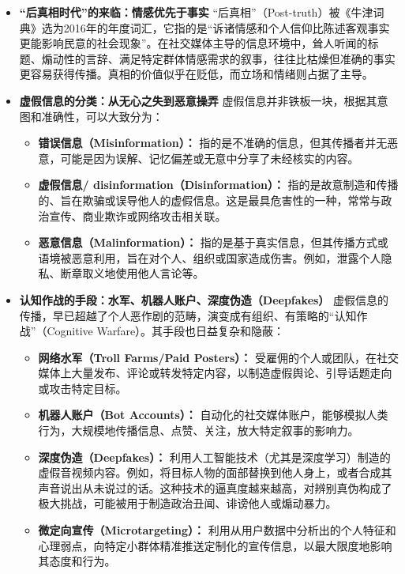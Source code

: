 \documentclass[UTF8, 10pt]{ctexbook}
\begin{document}
\begin{itemize}
    \item \textbf{“后真相时代”的来临：情感优先于事实}
    “后真相”（Post-truth）被《牛津词典》选为2016年的年度词汇，它指的是“诉诸情感和个人信仰比陈述客观事实更能影响民意的社会现象”。在社交媒体主导的信息环境中，耸人听闻的标题、煽动性的言辞、满足特定群体情感需求的叙事，往往比枯燥但准确的事实更容易获得传播。真相的价值似乎在贬低，而立场和情绪则占据了主导。

    \item \textbf{虚假信息的分类：从无心之失到恶意操弄}
    虚假信息并非铁板一块，根据其意图和准确性，可以大致分为：
    \begin{itemize}
        \item \textbf{错误信息（Misinformation）：} 指的是不准确的信息，但其传播者并无恶意，可能是因为误解、记忆偏差或无意中分享了未经核实的内容。
        \item \textbf{虚假信息/ disinformation（Disinformation）：} 指的是故意制造和传播的、旨在欺骗或误导他人的虚假信息。这是最具危害性的一种，常常与政治宣传、商业欺诈或网络攻击相关联。
        \item \textbf{恶意信息（Malinformation）：} 指的是基于真实信息，但其传播方式或语境被恶意利用，旨在对个人、组织或国家造成伤害。例如，泄露个人隐私、断章取义地使用他人言论等。
    \end{itemize}

    \item \textbf{认知作战的手段：水军、机器人账户、深度伪造（Deepfakes）}
    虚假信息的传播，早已超越了个人恶作剧的范畴，演变成有组织、有策略的“认知作战”（Cognitive Warfare）。其手段也日益复杂和隐蔽：
    \begin{itemize}
        \item \textbf{网络水军（Troll Farms/Paid Posters）：} 受雇佣的个人或团队，在社交媒体上大量发布、评论或转发特定内容，以制造虚假舆论、引导话题走向或攻击特定目标。
        \item \textbf{机器人账户（Bot Accounts）：} 自动化的社交媒体账户，能够模拟人类行为，大规模地传播信息、点赞、关注，放大特定叙事的影响力。
        \item \textbf{深度伪造（Deepfakes）：} 利用人工智能技术（尤其是深度学习）制造的虚假音视频内容。例如，将目标人物的面部替换到他人身上，或者合成其声音说出从未说过的话。这种技术的逼真度越来越高，对辨别真伪构成了极大挑战，可能被用于制造政治丑闻、诽谤他人或煽动暴力。
        \item \textbf{微定向宣传（Microtargeting）：} 利用从用户数据中分析出的个人特征和心理弱点，向特定小群体精准推送定制化的宣传信息，以最大限度地影响其态度和行为。
    \end{itemize}


\end{itemize}
\end{document}
